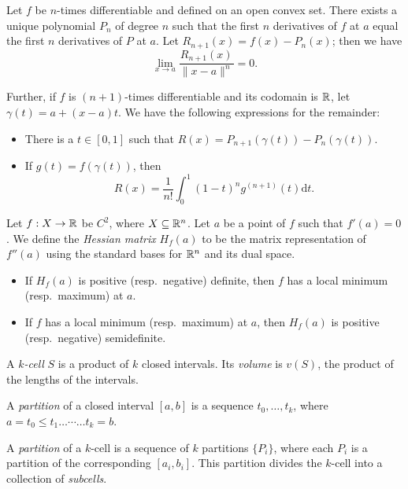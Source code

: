 \begin{thm}[Taylor]
    Let $f$ be $n$-times differentiable and defined on an open convex set.
    There exists a unique polynomial $P_n$ of degree $n$
    such that the first $n$ derivatives of $f$ at $a$ equal the first $n$ derivatives
    of $P$ at $a$. Let $R_{n+1}(x)=f(x)-P_n(x)$; then we have
    \[\lim_{x\to a}\frac{R_{n+1}(x)}{\|x-a\|^n}=0.\]

    Further, if $f$ is $(n+1)$-times differentiable and its codomain is $\mathbb{R}$,
    let $\gamma(t)=a+(x-a)t$. We have the following expressions for the remainder:
    \begin{itemize}
        \item There is a $t\in[0,1]$ such that
            $R(x)=P_{n+1}(\gamma(t))-P_n(\gamma(t))$.
        \item If $g(t)=f(\gamma(t))$, then
            \[R(x)=\frac 1{n!}\int_0^1 (1-t)^n g^{(n+1)}(t)\mathrm dt.\]
    \end{itemize}
\end{thm}
\begin{prop}
    Let $f:X\to\mathbb{R}$ be $C^2$, where $X\subseteq\mathbb{R}^n$.
    Let $a$ be a point of $f$ such that $f'(a)=0$.
    We define the \emph{Hessian matrix} $H_f(a)$ to be the matrix representation
    of $f''(a)$ using the standard bases for $\mathbb{R}^n$ and its dual space.
    \begin{itemize}
        \item If $H_f(a)$ is positive (resp.\ negative) definite, then $f$ has a
            local minimum (resp.\ maximum) at $a$.
        \item If $f$ has a local minimum (resp.\ maximum) at $a$, then $H_f(a)$
            is positive (resp.\ negative) semidefinite.
    \end{itemize}
\end{prop}
\begin{defn}
    A \emph{$k$-cell} $S$ is a product of $k$ closed intervals. Its \emph{volume} is
    $v(S)$, the product of the lengths of the intervals.
\end{defn}
\begin{defn}
    A \emph{partition} of a closed interval $[a,b]$ is a sequence
    $t_0,\ldots,t_k$, where $a=t_0\le t_1\ldots\cdots\ldots t_k=b$.

    A \emph{partition} of a $k$-cell
    is a sequence of $k$ partitions $\{P_i\}$, where each $P_i$ is
    a partition of the corresponding $[a_i,b_i]$.
    This partition divides the $k$-cell into a collection of \emph{subcells}.
\end{defn}
